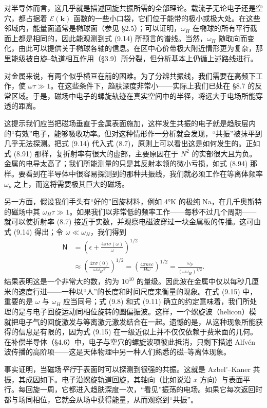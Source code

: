 对半导体而言，这几乎就是描述回旋共振所需的全部理论。载流子无论电子还是空穴，都占据着 $\mathcal{E}(\mathbf{k})$ 函数的一些小口袋，它们位于能带的极小或极大处。在这些邻域内，能量面通常是椭球面（参见 §2.5）；可以证明，$\omega_H$ 在椭球的所有平行截面上都是相同的，因此能观测到式 (9.14) 所预言的谱线。当然，$\omega_H$ 随取向而变化，由此可以提供关于椭球各轴的信息。在区中心价带极大附近情形更为复杂，那里能级被自旋–轨道相互作用（§3.9）所分裂，但分析基本上仍循上述路线进行。

对金属来说，有两个似乎横亘在前的困难。为了分辨共振线，我们需要在高频下工作，使 $\omega\tau\gg 1$。在这些条件下，趋肤深度非常小——实际上我们已处在 §8.7 的反常区域。于是，磁场中电子的螺旋轨迹在真实空间中的半径，将远大于电场所能穿透的距离。

这提示我们应当把磁场垂直于金属表面施加，这样发生共振的电子就是趋肤层内的“有效”电子，能够吸收功率。但对这种情形作一分析就会发现，“共振”被抹平到几乎无法探测。把式 (9.14) 代入式 (8.7)，原则上可以看出这是如何发生的。正如式 (8.91) 那样，复折射率有很大的虚部，主要原因在于 $N^{2}$ 的实部很大且为负。金属的电导太高了；我们所能测量的只是其反射本领的微小亏损，如式 (8.94) 那样。要看到在半导体中很容易探测到的那种共振线，我们就必须工作在等离体频率 $\omega_p$ 之上，而这将需要极其巨大的磁场。

另一方面，假设我们手头有“好的”回旋材料，例如 4°K 的极纯 Na，在几千奥斯特的磁场中其 $\omega_H\tau\gg 1$。如果我们以非常低的频率工作——每秒不过几个周期——就可以使折射率 (8.7) 接近于实数，并观察电磁波穿过一块金属板的传播。这可由式 (9.14) 得出；令 $\omega\ll\omega_H$，我们得到
\begin{align*}
\mathsf{N}&=\left(\epsilon+\frac{4\pi i\sigma(\omega)}{\omega}\right)^{1/2}\\
&\approx\left(\frac{4\pi\sigma(0)}{\omega\omega_H\tau}\right)^{1/2}=\left(\frac{4\pi nec}{H\omega}\right)^{1/2}=\frac{\omega_p}{(\omega\omega_H)^{1/2}}. \tag{9.15}
\end{align*}
结果表明这是一个非常大的数，约为 $10^{10}$ 的量级。因此波在金属中仅以每秒几厘米的速度行进——一种以“人”的长度和时间尺度来衡量的现象。在式 (9.15) 中，重要的是 $\omega$ 与 $\omega_H$ 应当同号；式 (9.8) 和式 (9.11) 确立的约定意味着，我们所处理的是与电子回旋运动同相位旋转的圆偏振波。这样，一个螺旋波（helicon）模就把电子气的回旋激发与等离激元激发结合在一起。遗憾的是，从这种现象所能获得的信息是有限的，因为式 (9.15) 在一级近似上并不仅仅依赖于费米面的几何。在补偿半导体（§4.6）中，电子与空穴的螺旋波项彼此抵消，只剩下描述 Alfvén 波传播的高阶项——这是天体物理中另一种人们熟悉的磁–等离体现象。

事实证明，当磁场\emph{平行}于表面时可以探测到很强的共振。这就是 Azbel'–Kaner 共振，其成因如下。电子沿螺旋轨道回旋，其轴向（比如说沿 $x$ 方向）与表面平行。每回旋一周，它都进入趋肤深度一次，“看见”振荡的电场。如果它每次返回时都与场同相位，它就会从场中获得能量，从而观察到“共振”。

